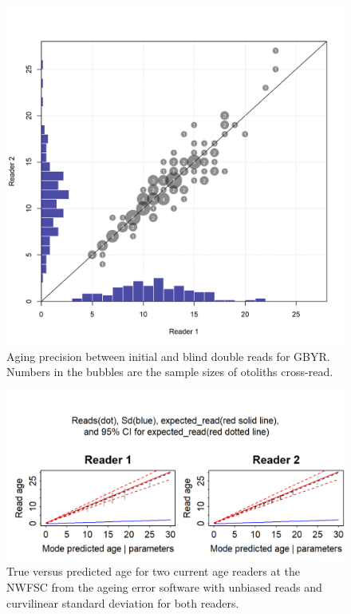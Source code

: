 \documentclass[12pt,]{article}
\begin{document}
\begin{figure}
\centering
\includegraphics{Figures/GBY_age_error.png}
\caption{Aging precision between initial and blind double reads for
GBYR. Numbers in the bubbles are the sample sizes of otoliths
cross-read. \label{fig:GBY_age_error}}
\end{figure}

\begin{figure}
\centering
\includegraphics{Figures/GBY_age_error2.png}
\caption{True versus predicted age for two current age readers at the
NWFSC from the ageing error software with unbiased reads and curvilinear
standard deviation for both readers. \label{fig:GBY_age_error2}}
\end{figure}
\end{document}
